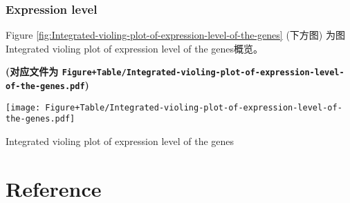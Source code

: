 \documentclass[
]{article}
\begin{document}
\hypertarget{expression-level}{%
\subsubsection{Expression level}\label{expression-level}}

Figure \ref{fig:Integrated-violing-plot-of-expression-level-of-the-genes} (下方图) 为图Integrated violing plot of expression level of the genes概览。

\textbf{(对应文件为 \texttt{Figure+Table/Integrated-violing-plot-of-expression-level-of-the-genes.pdf})}

\def\@captype{figure}
\begin{center}
\texttt{[image: Figure+Table/Integrated-violing-plot-of-expression-level-of-the-genes.pdf]}
\caption{Integrated violing plot of expression level of the genes}\label{fig:Integrated-violing-plot-of-expression-level-of-the-genes}
\end{center}

\hypertarget{bibliography}{%
\section*{Reference}\label{bibliography}}
\end{document}
